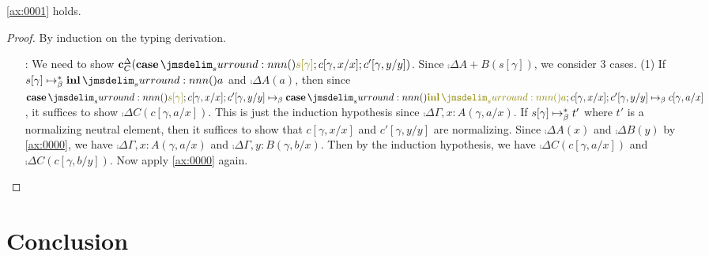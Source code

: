 \documentclass[a4paper]{article}
\begin{document}
\begin{lemma}
  \cref{ax:0001} holds.
\end{lemma}
\begin{proof}
  By induction on the typing derivation.
  \begin{itemize}
  \item[\rSumE:] We need to show $\comp{\Delta}{C}(\tmCase{s[\gamma]}{c[\gamma,x/x]}{c'[\gamma,y/y]})$.
    Since $\comp{\Delta}{A + B}(s[\gamma])$, we consider 3 cases.
    (1) If $s[\gamma] \bRed* \tmInl{a}$ and $\comp{\Delta}{A}(a)$, then since $\tmCase{s[\gamma]}{c[\gamma,x/x]}{c'[\gamma,y/y]} \bRed \tmCase{\tmInl{a}}{c[\gamma,x/x]}{c'[\gamma,y/y]} \bRed c[\gamma,a/x]$, it suffices to show $\comp{\Delta}{C}(c[\gamma,a/x])$.
    This is just the induction hypothesis since $\comp{\Delta}{\Gamma,x : A}(\gamma,a/x)$.
    If $s[\gamma] \bRed* t'$ where $t'$ is a normalizing neutral element, then it suffices to show that $c[\gamma,x/x]$ and $c'[\gamma,y/y]$ are normalizing.
    Since $\comp{\Delta}{A}(x)$ and $\comp{\Delta}{B}(y)$ by \cref{ax:0000}, we have $\comp{\Delta}{\Gamma,x : A}(\gamma,a/x)$ and $\comp{\Delta}{\Gamma,y : B}(\gamma,b/x)$.
    Then by the induction hypothesis, we have $\comp{\Delta}{C}(c[\gamma,a/x])$ and $\comp{\Delta}{C}(c[\gamma,b/y])$.
    Now apply \cref{ax:0000} again.
  \end{itemize}
\end{proof}
\section{Conclusion}
\label{sec:0007}





\end{document}
